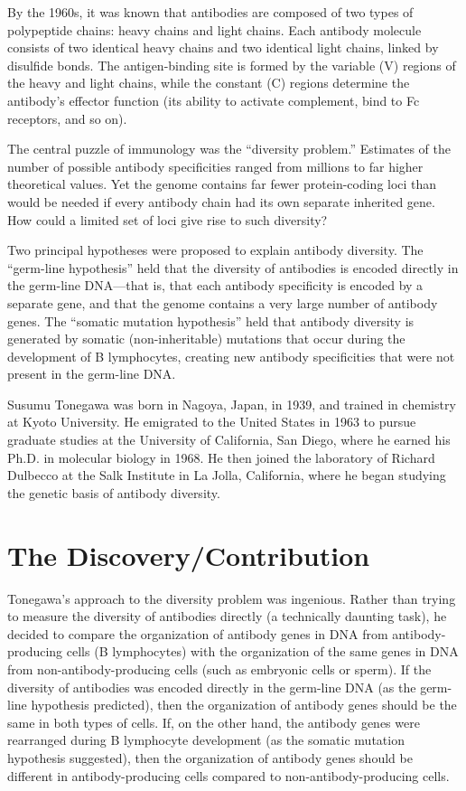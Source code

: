 By the 1960s, it was known that antibodies are composed of two types of polypeptide chains: heavy chains and light chains. Each antibody molecule consists of two identical heavy chains and two identical light chains, linked by disulfide bonds. The antigen-binding site is formed by the variable (V) regions of the heavy and light chains, while the constant (C) regions determine the antibody's effector function (its ability to activate complement, bind to Fc receptors, and so on).

The central puzzle of immunology was the ``diversity problem.'' Estimates of the number of possible antibody specificities ranged from millions to far higher theoretical values. Yet the genome contains far fewer protein-coding loci than would be needed if every antibody chain had its own separate inherited gene. How could a limited set of loci give rise to such diversity?

Two principal hypotheses were proposed to explain antibody diversity. The ``germ-line hypothesis'' held that the diversity of antibodies is encoded directly in the germ-line DNA---that is, that each antibody specificity is encoded by a separate gene, and that the genome contains a very large number of antibody genes. The ``somatic mutation hypothesis'' held that antibody diversity is generated by somatic (non-inheritable) mutations that occur during the development of B lymphocytes, creating new antibody specificities that were not present in the germ-line DNA.

Susumu Tonegawa was born in Nagoya, Japan, in 1939, and trained in chemistry at Kyoto University. He emigrated to the United States in 1963 to pursue graduate studies at the University of California, San Diego, where he earned his Ph.D. in molecular biology in 1968. He then joined the laboratory of Richard Dulbecco at the Salk Institute in La Jolla, California, where he began studying the genetic basis of antibody diversity.

\section{The Discovery/Contribution}

Tonegawa's approach to the diversity problem was ingenious. Rather than trying to measure the diversity of antibodies directly (a technically daunting task), he decided to compare the organization of antibody genes in DNA from antibody-producing cells (B lymphocytes) with the organization of the same genes in DNA from non-antibody-producing cells (such as embryonic cells or sperm). If the diversity of antibodies was encoded directly in the germ-line DNA (as the germ-line hypothesis predicted), then the organization of antibody genes should be the same in both types of cells. If, on the other hand, the antibody genes were rearranged during B lymphocyte development (as the somatic mutation hypothesis suggested), then the organization of antibody genes should be different in antibody-producing cells compared to non-antibody-producing cells.

